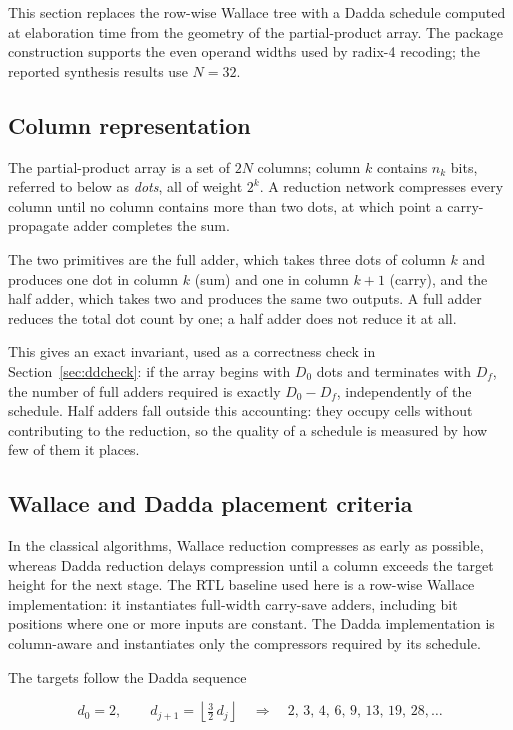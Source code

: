\documentclass[11pt,a4paper]{article}
\begin{document}
This section replaces the row-wise Wallace tree with a Dadda schedule computed
at elaboration time from the geometry of the partial-product array. The package
construction supports the even operand widths used by radix-4 recoding; the
reported synthesis results use $N=32$.

\subsection{Column representation}

The partial-product array is a set of $2N$ columns; column $k$ contains $n_k$
bits, referred to below as \emph{dots}, all of weight $2^k$. A reduction network
compresses every column until no column contains more than two dots, at which
point a carry-propagate adder completes the sum.

The two primitives are the full adder, which takes three dots of column $k$ and
produces one dot in column $k$ (sum) and one in column $k+1$ (carry), and the
half adder, which takes two and produces the same two outputs. A full adder
reduces the total dot count by one; a half adder does not reduce it at all.

This gives an exact invariant, used as a correctness check in
Section~\ref{sec:ddcheck}: if the array begins with $D_0$ dots and terminates
with $D_f$, the number of full adders required is exactly $D_0 - D_f$,
independently of the schedule. Half adders fall outside this accounting: they
occupy cells without contributing to the reduction, so the quality of a schedule
is measured by how few of them it places.

\subsection{Wallace and Dadda placement criteria}

In the classical algorithms, Wallace reduction compresses as early as possible,
whereas Dadda reduction delays compression until a column exceeds the target
height for the next stage. The RTL baseline used here is a row-wise Wallace
implementation: it instantiates full-width carry-save adders, including bit
positions where one or more inputs are constant. The Dadda implementation is
column-aware and instantiates only the compressors required by its schedule.

The targets follow the Dadda sequence

\begin{equation}
d_0 = 2, \qquad d_{j+1} = \left\lfloor \tfrac{3}{2}\, d_j \right\rfloor
\quad\Longrightarrow\quad 2,\,3,\,4,\,6,\,9,\,13,\,19,\,28,\ldots
\label{eq:dadda}
\end{equation}
\end{document}
